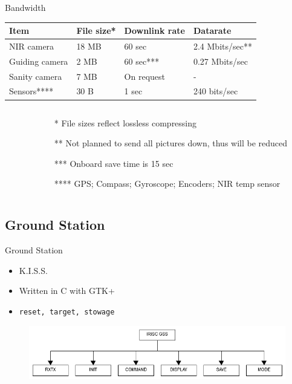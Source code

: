 \documentclass[11pt, aspectratio=169]{beamer}
\begin{document}
\begin{frame}[c]{Bandwidth}
\centering
\begin{tabular}{| l | l | l | l |}
	\hline
	\textbf{Item} & \textbf{File size*} & \textbf{Downlink rate} & \textbf{Datarate} \\\hline\hline
	
	NIR camera		& 18 MB & 60 sec 	& 2.4 Mbits/sec** \\\hline
	Guiding camera	& 2 MB	& 60 sec***	& 0.27 Mbits/sec \\\hline
	Sanity camera	& 7 MB  & On request & - \\\hline
	Sensors****		& 30 B  & 1 sec 	& 240 bits/sec \\\hline
	

\end{tabular}
\newline

\begin{columns}[t]
\begin{column}{0.1\textwidth}
\end{column}
\begin{column}{0.9\textwidth}
\begin{enumerate}
	\small
	\item[*] File sizes reflect lossless compressing
	\item[**] Not planned to send all pictures down, thus will be reduced
	\item[***] Onboard save time is 15 sec
	\item[****] GPS; Compass; Gyroscope; Encoders; NIR temp sensor
\end{enumerate}
\end{column}
\end{columns}
\end{frame}

\subsection{Ground Station} 	%
\begin{frame}{Ground Station}
\begin{itemize}
	\item K.I.S.S.
	\item Written in C with GTK+
	\item \texttt{reset, target, stowage}
\end{itemize}
\begin{figure}
	\includegraphics[scale=0.4]{figures/images/GSS-tree.png}
\end{figure}
\end{frame}
\end{document}
